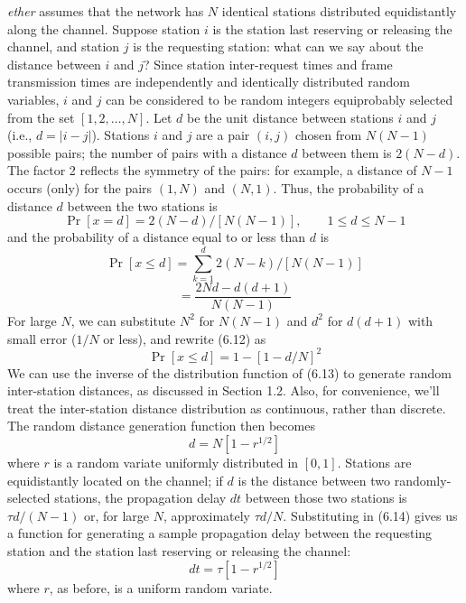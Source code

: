 \emph{ether} assumes that the network has $N$ identical stations distributed equidistantly along the channel. Suppose station $i$ is the station last reserving or releasing the channel, and station $j$ is the requesting station: what can we say about the distance between $i$ and $j$? Since station inter-request times and frame transmission times are independently and identically distributed random variables, $i$ and $j$ can be considered to be random integers equiprobably selected from the set $[1,2,\ldots,N]$. Let $d$ be the unit distance between stations $i$ and $j$ (i.e., $d=|i-j|$). Stations $i$ and $j$ are a pair $(i,j)$ chosen from $N(N-1)$ possible pairs; the number of pairs with a distance $d$ between them is $2(N-d)$. The factor 2 reflects the symmetry of the pairs: for example, a distance of $N-1$ occurs (only) for the pairs $(1,N)$ and $(N,1)$. Thus, the probability of a distance $d$ between the two stations is
\begin{equation} \Pr[x=d]=2(N-d)/[N(N-1)],\qquad 1\le d\le N-1 \end{equation}
and the probability of a distance equal to or less than $d$ is
\begin{equation} \Pr[x\le d]=\sum_{k=1}^{d}2(N-k)/[N(N-1)] \end{equation}
\begin{equation} =\frac{2Nd-d(d+1)}{N(N-1)} \end{equation}
For large $N$, we can substitute $N^2$ for $N(N-1)$ and $d^2$ for $d(d+1)$ with small error ($1/N$ or less), and rewrite (6.12) as
\begin{equation} \Pr[x\le d]=1-[1-d/N]^2 \end{equation}
We can use the inverse of the distribution function of (6.13) to generate random inter-station distances, as discussed in Section 1.2. Also, for convenience, we'll treat the inter-station distance distribution as continuous, rather than discrete. The random distance generation function then becomes
\begin{equation} d=N[1-r^{1/2}] \end{equation}
where $r$ is a random variate uniformly distributed in $[0,1]$. Stations are equidistantly located on the channel; if $d$ is the distance between two randomly-selected stations, the propagation delay $dt$ between those two stations is $\tau d/(N-1)$ or, for large $N$, approximately $\tau d/N$. Substituting in (6.14) gives us a function for generating a sample propagation delay between the requesting station and the station last reserving or releasing the channel:
\begin{equation} dt=\tau[1-r^{1/2}] \end{equation}
where $r$, as before, is a uniform random variate.

